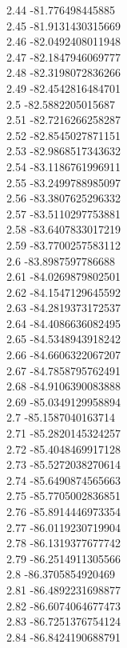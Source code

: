 {2.44	-81.776498445885\\
2.45	-81.9131430315669\\
2.46	-82.0492408011948\\
2.47	-82.1847946069777\\
2.48	-82.3198072836266\\
2.49	-82.4542816484701\\
2.5	-82.5882205015687\\
2.51	-82.7216266258287\\
2.52	-82.8545027871151\\
2.53	-82.9868517343632\\
2.54	-83.1186761996911\\
2.55	-83.2499788985097\\
2.56	-83.3807625296332\\
2.57	-83.5110297753881\\
2.58	-83.6407833017219\\
2.59	-83.7700257583112\\
2.6	-83.8987597786688\\
2.61	-84.0269879802501\\
2.62	-84.1547129645592\\
2.63	-84.2819373172537\\
2.64	-84.4086636082495\\
2.65	-84.5348943918242\\
2.66	-84.6606322067207\\
2.67	-84.7858795762491\\
2.68	-84.9106390083888\\
2.69	-85.0349129958894\\
2.7	-85.1587040163714\\
2.71	-85.2820145324257\\
2.72	-85.4048469917128\\
2.73	-85.5272038270614\\
2.74	-85.6490874565663\\
2.75	-85.7705002836851\\
2.76	-85.8914446973354\\
2.77	-86.0119230719904\\
2.78	-86.1319377677742\\
2.79	-86.2514911305566\\
2.8	-86.3705854920469\\
2.81	-86.4892231698877\\
2.82	-86.6074064677473\\
2.83	-86.7251376754124\\
2.84	-86.8424190688791\\
}
